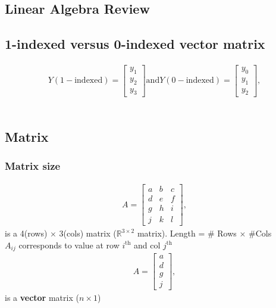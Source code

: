 \documentclass[a4paper,12pt]{report}
\begin{document}
 
\begin{appendices}
\chapter{Linear Algebra Review}
\section{1-indexed versus 0-indexed vector matrix}

\begin{align*}
		Y(\mathrm{1-indexed}) = \begin{bmatrix} y_1 \\ y_2 \\ y_3 \end{bmatrix}  \mathrm{and}  Y(\mathrm{0-indexed}) = \begin{bmatrix} y_0 \\ y_1 \\ y_2 \end{bmatrix},
\end{align*}
\\

\section{Matrix}
\subsection {Matrix size}
\begin{align*}
		A = \begin{bmatrix} a & b & c \\ d & e & f \\ g & h & i \\ j & k & l \end{bmatrix},
\end{align*}
is a 4(rows) $\times$ 3(cols) matrix ($\mathbb{R} ^ {3 \times 2}$ matrix). Length = \# Rows $\times$ \#Cols
\\
$A_{ij}$ corresponds to value at row $i^{\mathrm{th}}$ and col $j^{\mathrm{th}}$
\\
\begin{align*}
		 A = \begin{bmatrix} a \\ d \\ g \\ j 
		\end{bmatrix},
\end{align*}
is a \textbf{vector} matrix ($n \times 1$)


\end{appendices}
\end{document}

